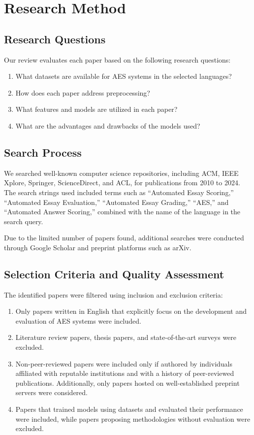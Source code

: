 \documentclass{article}
\begin{document}
\section{Research Method}
\subsection{Research Questions}
Our review evaluates each paper based on the following research questions:
\begin{enumerate}[label=\textbf{RQ\arabic*}, leftmargin=1.5cm]
	\item What datasets are available for AES systems in the selected languages?
	\item How does each paper address preprocessing?
	\item What features and models are utilized in each paper?
	\item What are the advantages and drawbacks of the models used?
\end{enumerate}

\subsection{Search Process}
We searched well-known computer science repositories, including ACM, IEEE Xplore, Springer, ScienceDirect, and ACL, for publications from 2010 to 2024. The search strings used included terms such as “Automated Essay Scoring,” “Automated Essay Evaluation,” “Automated Essay Grading,” “AES,” and “Automated Answer Scoring,” combined with the name of the language in the search query. 

Due to the limited number of papers found, additional searches were conducted through Google Scholar and preprint platforms such as arXiv.

\subsection{Selection Criteria and Quality Assessment}
The identified papers were filtered using inclusion and exclusion criteria:
\begin{enumerate}[label=\textbf{Criteria \arabic*}, leftmargin=2cm]
	\item Only papers written in English that explicitly focus on the development and evaluation of AES systems were included.
	\item Literature review papers, thesis papers, and state-of-the-art surveys were excluded.
	\item Non-peer-reviewed papers were included only if authored by individuals affiliated with reputable institutions and with a history of peer-reviewed publications. Additionally, only papers hosted on well-established preprint servers were considered.
	\item Papers that trained models using datasets and evaluated their performance were included, while papers proposing methodologies without evaluation were excluded.
\end{enumerate}
\end{document}
